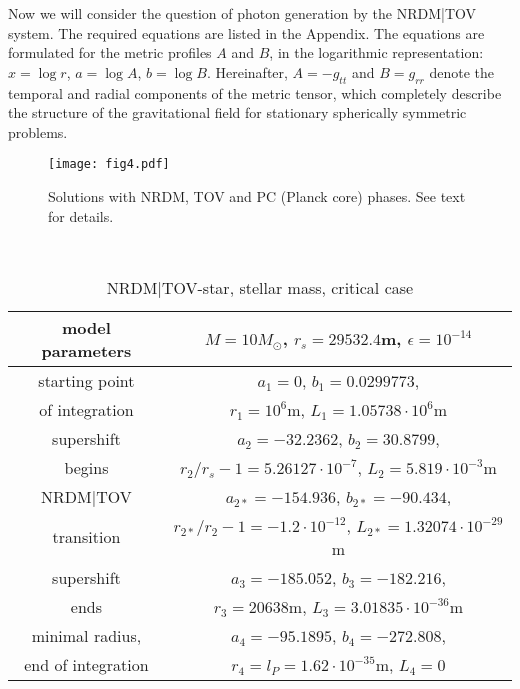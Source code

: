 \documentclass{article}
\begin{document}
Now we will consider the question of photon generation by the NRDM|TOV system. The required equations are listed in the Appendix. The equations are formulated for the metric profiles $ A $ and $ B $, in the logarithmic representation: $ x = \log r $, $ a = \log A $, $ b = \log B $. Hereinafter, $ A = -g_ {tt} $ and $ B = g_ {rr} $ denote the temporal and radial components of the metric tensor, which completely describe the structure of the gravitational field for stationary spherically symmetric problems. 

\begin{figure}
\begin{center}
\texttt{[image: fig4.pdf]}
\end{center}
\caption{Solutions with NRDM, TOV and PC (Planck core) phases. See text for details.}\label{f4}
\end{figure}

\begin{table}
\begin{center}{\footnotesize
\caption{NRDM|TOV-star, stellar mass, critical case}\label{tab1}

~

\def\arraystretch{1.1}
\begin{tabular}{|c|c|}
\hline
model parameters&$M=10 M_\odot$, $r_{s}=29532.4$m, $\epsilon=10^{-14}$\\ \hline
starting point&$a_1=0$, $b_1=0.0299773$, \\ 
of integration& $r_1=10^6$m, $L_1=1.05738\cdot10^6$m\\ \hline
supershift&$a_{2}=-32.2362$, $b_{2}=30.8799$, \\ 
begins&$r_{2}/r_s-1=5.26127\cdot10^{-7}$, $L_2=5.819\cdot10^{-3}$m\\ \hline
NRDM|TOV&$a_{2*}=-154.936$, $b_{2*}=-90.434$, \\ 
transition&$r_{2*}/r_2-1=-1.2\cdot10^{-12}$, $L_{2*}=1.32074\cdot10^{-29}$m\\ \hline
supershift&$a_{3}=-185.052$, $b_{3}=-182.216$, \\ 
ends&$r_{3}=20638$m, $L_3=3.01835\cdot10^{-36}$m\\ \hline
minimal radius,& $a_4=-95.1895$, $b_4=-272.808$, \\ 
end of integration&$r_4=l_P=1.62\cdot10^{-35}$m, $L_4=0$\\ \hline
\end{tabular}

}\end{center}
\end{table}
\end{document}
